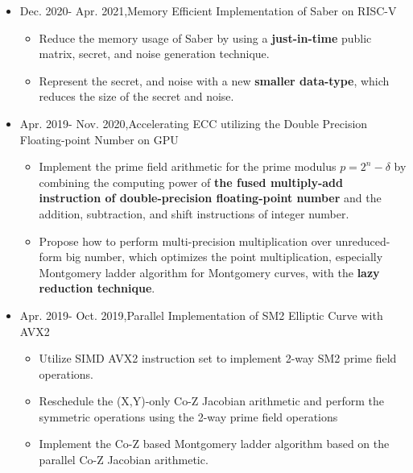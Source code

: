 \documentclass[letterpaper,11pt]{article}
\newcommand{\resitem}[1]{\item #1 \vspace{-2pt}}
\begin{document}
\begin{itemize}
	\item
	Dec. 2020- Apr. 2021,\quad Memory Efficient Implementation of Saber on RISC-V
	\begin{itemize}
		\resitem{Reduce the memory usage of Saber by using a \textbf{just-in-time} public matrix, secret, and noise generation technique.}
		\resitem{Represent the secret, and noise with a new \textbf{smaller data-type}, which reduces the size of the secret and noise.}
	\end{itemize}
	\item
	Apr. 2019- Nov. 2020,\quad Accelerating ECC utilizing the Double Precision Floating-point Number on GPU
	\begin{itemize}
		\resitem{Implement the prime field arithmetic for the prime modulus $p=2^n-\delta$ by combining the computing power of \textbf{the fused multiply-add instruction of double-precision floating-point number} and the addition, subtraction, and shift instructions of integer number. }
		\resitem{Propose how to perform multi-precision multiplication over unreduced-form big number, which optimizes the point multiplication, especially Montgomery ladder algorithm for Montgomery curves, with the \textbf{lazy reduction technique}.}
	\end{itemize}
	\item
	Apr. 2019- Oct. 2019,\quad Parallel Implementation of SM2 Elliptic Curve with AVX2
	\begin{itemize}
		\resitem{Utilize SIMD AVX2 instruction set to implement 2-way SM2 prime field operations.}

		\resitem{Reschedule the (X,Y)-only Co-Z Jacobian arithmetic and perform the symmetric operations using the 2-way prime field operations}

		\resitem{Implement the Co-Z based Montgomery ladder algorithm based on the parallel Co-Z Jacobian arithmetic.}


\end{itemize}
\end{itemize}
\end{document}
